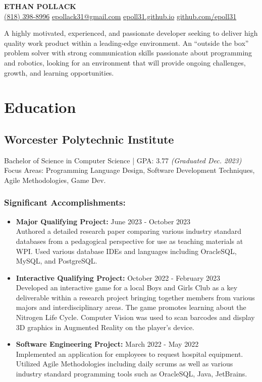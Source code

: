 \documentclass[a4paper,10pt]{article}
\begin{document}
\begin{center}
    \textbf{\LARGE ETHAN 
    POLLACK} \\
    \href{tel:(818) 398-8996}{(818) 398-8996} \quad
    \href{mailto:epollack31@gmail.com}{epollack31@gmail.com} \quad
    \href{https://epoll31.github.io}{epoll31.github.io} \quad
    \href{https://github.com/epoll31}{github.com/epoll31}
\end{center}

\noindent A highly motivated, experienced, and passionate developer seeking to deliver high quality work product within a leading-edge environment. An “outside the box” problem solver with strong communication skills passionate about programming and robotics, looking for an environment that will provide ongoing challenges, growth, and learning opportunities.

\section*{Education}
\subsection*{Worcester Polytechnic Institute} Bachelor of Science in Computer Science | GPA: 3.77 \textit{(Graduated Dec. 2023)}\\
Focus Areas: Programming Language Design, Software Development Techniques, Agile Methodologies, Game Dev.
\subsubsection*{Significant Accomplishments:}
    \begin{itemize}
        \item \textbf{Major Qualifying Project:} June 2023 - October 2023\\
        Authored a detailed research paper comparing various industry standard databases from a pedagogical perspective for use as teaching materials at WPI. Used various database IDEs and languages including OracleSQL, MySQL, and PostgreSQL.
        \item \textbf{Interactive Qualifying Project:} October 2022 - February 2023\\
        Developed an interactive game for a local Boys and Girls Club as a key deliverable within a research project bringing together members from various majors and interdisciplinary areas. The game promotes learning about the Nitrogen Life Cycle. Computer Vision was used to scan barcodes and display 3D graphics in Augmented Reality on the player’s device.
        \item \textbf{Software Engineering Project:} March 2022 - May 2022\\
        Implemented an application for employees to request hospital equipment. Utilized Agile Methodologies including daily scrums as well as various industry standard programming tools such as OracleSQL, Java, JetBrains.
    \end{itemize}
\end{document}
